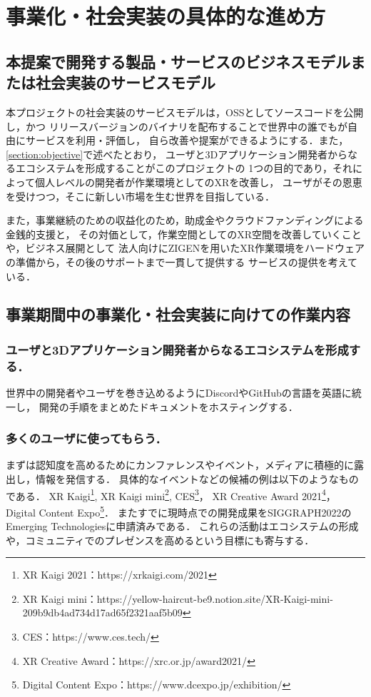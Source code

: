 \section{事業化・社会実装の具体的な進め方}

\subsection{本提案で開発する製品・サービスのビジネスモデルまたは社会実装のサービスモデル}

本プロジェクトの社会実装のサービスモデルは，OSSとしてソースコードを公開し，かつ
リリースバージョンのバイナリを配布することで世界中の誰でもが自由にサービスを利用・評価し，
自ら改善や提案ができるようにする．また，\ref{section:objective}で述べたとおり，
ユーザと3Dアプリケーション開発者からなるエコシステムを形成することがこのプロジェクトの
1つの目的であり，それによって個人レベルの開発者が作業環境としてのXRを改善し，
ユーザがその恩恵を受けつつ，そこに新しい市場を生む世界を目指している．

また，事業継続のための収益化のため，助成金やクラウドファンディングによる金銭的支援と，
その対価として，作業空間としてのXR空間を改善していくことや，ビジネス展開として
法人向けにZIGENを用いたXR作業環境をハードウェアの準備から，その後のサポートまで一貫して提供する
サービスの提供を考えている．

\subsection{事業期間中の事業化・社会実装に向けての作業内容}
\label{section:biz-plan-detail}

\subsubsection*{ユーザと3Dアプリケーション開発者からなるエコシステムを形成する．}

世界中の開発者やユーザを巻き込めるようにDiscordやGitHubの言語を英語に統一し，
開発の手順をまとめたドキュメントをホスティングする．

\subsubsection*{多くのユーザに使ってもらう．}

まずは認知度を高めるためにカンファレンスやイベント，メディアに積極的に露出し，情報を発信する．
具体的なイベントなどの候補の例は以下のようなものである．
XR Kaigi\footnote{XR Kaigi 2021：https://xrkaigi.com/2021},
XR Kaigi mini\footnote{XR Kaigi mini：https://yellow-haircut-be9.notion.site/XR-Kaigi-mini-209b9db4ad734d17ad65f2321aaf5b09},
CES\footnote{CES：https://www.ces.tech/}，
XR Creative Award 2021\footnote{XR Creative Award：https://xrc.or.jp/award2021/}，
Digital Content Expo\footnote{Digital Content Expo：https://www.dcexpo.jp/exhibition/}．
またすでに現時点での開発成果をSIGGRAPH2022のEmerging Technologiesに申請済みである．
これらの活動はエコシステムの形成や，コミュニティでのプレゼンスを高めるという目標にも寄与する．

